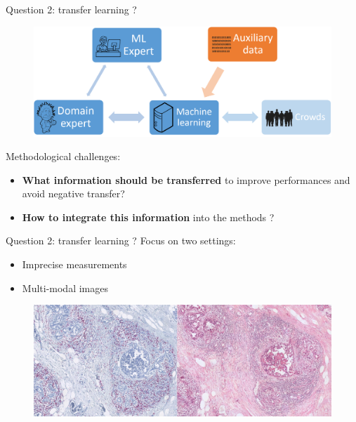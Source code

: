 \documentclass{beamer}
\begin{document}
\begin{frame}{Question 2: transfer learning ?}
	
	\begin{figure}
		\includegraphics[scale=0.25]{images/with_expert_and_crowd_and_aux.png}
	\end{figure}
	
	\hfill
	
	Methodological challenges:
	\begin{itemize}
		\item \textbf{What information should be transferred} to improve performances and avoid negative transfer? 
		\item \textbf{How to integrate this information} into the methods ? 
	\end{itemize}
	
\end{frame}

\begin{frame}{Question 2: transfer learning ?}	
	Focus on two settings:
	
	\begin{itemize}
		\item Imprecise measurements 
		\item Multi-modal images
	\end{itemize}

	\begin{figure}
		\center
		\includegraphics[scale=0.14]{images/multimodal.png}
	\end{figure}	
\end{frame}
\end{document}
